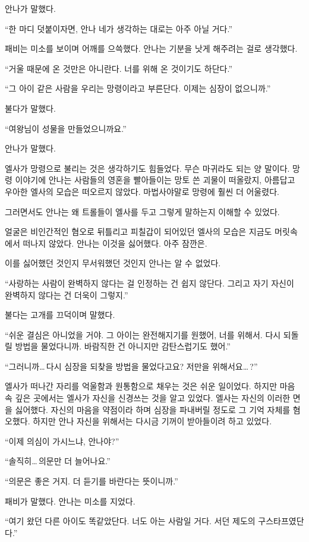 안나가 말했다.

``한 마디 덧붙이자면, 안나 네가 생각하는 대로는 아주 아닐 거다.''

패비는 미소를 보이며 어깨를 으쓱했다. 안나는 기분을 낫게 해주려는 걸로 생각했다.

``거울 때문에 온 것만은 아니란다. 너를 위해 온 것이기도 하단다.''

``그 아이 같은 사람을 우리는 망령이라고 부른단다. 이제는 심장이 없으니까.''

불다가 말했다.

``여왕님이 성물을 만들었으니까요.''

안나가 말했다.

엘사가 망령으로 불리는 것은 생각하기도 힘들었다. 무슨 마귀라도 되는 양 말이다. 망령 이야기에 안나는 사람들의 영혼을 빨아들이는 망토 쓴 괴물이 떠올랐지, 아름답고 우아한 엘사의 모습은 떠오르지 않았다. 마법사야말로 망령에 훨씬 더 어울렸다.

그러면서도 안나는 왜 트롤들이 엘사를 두고 그렇게 말하는지 이해할 수 있었다.

얼굴은 비인간적인 혐오로 뒤틀리고 피칠갑이 되어있던 엘사의 모습은 지금도 머릿속에서 떠나지 않았다. 안나는 이것을 싫어했다. 아주 잠깐은.

이를 싫어했던 것인지 무서워했던 것인지 안나는 알 수 없었다.

``사랑하는 사람이 완벽하지 않다는 걸 인정하는 건 쉽지 않단다. 그리고 자기 자신이 완벽하지 않다는 건 더욱이 그렇지.''

불다는 고개를 끄덕이며 말했다.

``쉬운 결심은 아니었을 거야. 그 아이는 완전해지기를 원했어, 너를 위해서. 다시 되돌릴 방법을 물었다니까. 바람직한 건 아니지만 감탄스럽기도 했어.''

``그러니까\ldots\,다시 심장을 되찾을 방법을 물었다고요? 저만을 위해서요\ldots\,?''

엘사가 떠나간 자리를 억울함과 원통함으로 채우는 것은 쉬운 일이었다. 하지만 마음 속 깊은 곳에서는 엘사가 자신을 신경쓰는 것을 알고 있었다. 엘사는 자신의 이러한 면을 싫어했다. 자신의 마음을 약점이라 하며 심장을 파내버릴 정도로 그 기억 자체를 혐오했다. 하지만 안나 자신을 위해서는 다시금 기꺼이 받아들이려 하고 있었다.

``이제 의심이 가시느냐, 안나야?''

``솔직히\ldots\,의문만 더 늘어나요.''

``의문은 좋은 거지. 더 듣기를 바란다는 뜻이니까.''

패비가 말했다. 안나는 미소를 지었다.

``여기 왔던 다른 아이도 똑같았단다. 너도 아는 사람일 거다. 서던 제도의 구스타프였단다.''

